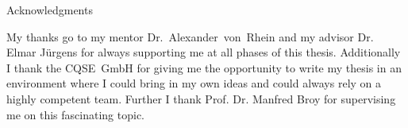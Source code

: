 \thispagestyle{empty}

\vspace*{20mm}

\begin{center}
{ Acknowledgments}
\end{center}

\vspace{10mm}

My thanks go to my mentor Dr.~Alexander~von~Rhein and my advisor Dr. Elmar Jürgens for always supporting me at all phases of this thesis. Additionally I thank the CQSE~GmbH for giving me the opportunity to write my thesis in an environment where I could bring in my own ideas and could always rely on a highly competent team. Further I thank Prof. Dr. Manfred Broy for supervising me on this fascinating topic.

\cleardoublepage{}
